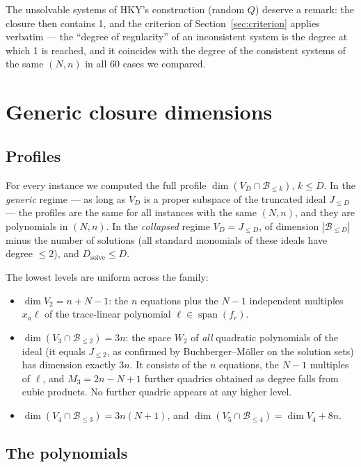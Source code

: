 \documentclass[11pt,a4paper]{article}
\theoremstyle{remark}\newtheorem{remark}{Remark}
\newcommand{\B}{\mathcal{B}}
\newcommand{\Dsolve}{D_{\mathrm{solve}}}
\begin{document}
The unsolvable systems of HKY's construction (random $Q$) deserve a remark: the closure then contains 1, and the criterion of Section~\ref{sec:criterion} applies verbatim --- the ``degree of regularity'' of an inconsistent system is the degree at which 1 is reached, and it coincides with the degree of the consistent systems of the same $(N,n)$ in all 60 cases we compared.

\section{Generic closure dimensions}\label{sec:generic}

\subsection{Profiles}

For every instance we computed the full profile $\dim(V_D\cap\B_{\le k})$, $k\le D$. In the \emph{generic} regime --- as long as $V_D$ is a proper subspace of the truncated ideal $J_{\le D}$ --- the profiles are the same for all instances with the same $(N,n)$, and they are polynomials in $(N,n)$. In the \emph{collapsed} regime $V_D=J_{\le D}$, of dimension $|\B_{\le D}|$ minus the number of solutions (all standard monomials of these ideals have degree $\le2$), and $\Dsolve\le D$.

The lowest levels are uniform across the family:
\begin{itemize}
\item $\dim V_2=n+N-1$: the $n$ equations plus the $N-1$ independent multiples $x_a\ell$ of the trace-linear polynomial $\ell\in\operatorname{span}(f_r)$.
\item $\dim(V_3\cap\B_{\le2})=3n$: the space $W_2$ of \emph{all} quadratic polynomials of the ideal (it equals $J_{\le2}$, as confirmed by Buchberger--Möller on the solution sets) has dimension exactly $3n$. It consists of the $n$ equations, the $N-1$ multiples of $\ell$, and $M_3=2n-N+1$ further quadrics obtained as degree falls from cubic products. No further quadric appears at any higher level.
\item $\dim(V_4\cap\B_{\le3})=3n(N+1)$, and $\dim(V_5\cap\B_{\le4})=\dim V_4+8n$.
\end{itemize}

\subsection{The polynomials}
\end{document}
